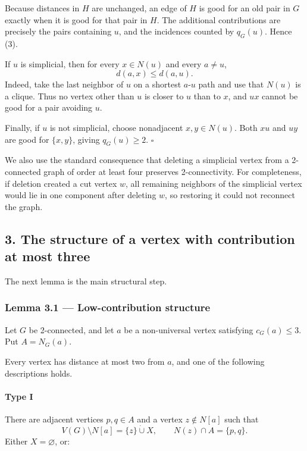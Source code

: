 \documentclass[
  11pt,
  a4paper,
]{article}
\begin{document}
Because distances in \(H\) are unchanged, an edge of \(H\) is good for
an old pair in \(G\) exactly when it is good for that pair in \(H\). The
additional contributions are precisely the pairs containing \(u\), and
the incidences counted by \(q_G(u)\). Hence (3).

If \(u\) is simplicial, then for every \(x\in N(u)\) and every
\(a\ne u\), \[
d(a,x)\le d(a,u).
\] Indeed, take the last neighbor of \(u\) on a shortest \(a\)-\(u\)
path and use that \(N(u)\) is a clique. Thus no vertex other than \(u\)
is closer to \(u\) than to \(x\), and \(ux\) cannot be good for a pair
avoiding \(u\).

Finally, if \(u\) is not simplicial, choose nonadjacent \(x,y\in N(u)\).
Both \(xu\) and \(uy\) are good for \(\{x,y\}\), giving \(q_G(u)\ge2\).
\(\square\)

We also use the standard consequence that deleting a simplicial vertex
from a 2-connected graph of order at least four preserves
2-connectivity. For completeness, if deletion created a cut vertex
\(w\), all remaining neighbors of the simplicial vertex would lie in one
component after deleting \(w\), so restoring it could not reconnect the
graph.

\subsection{3. The structure of a vertex with contribution at most
three}\label{the-structure-of-a-vertex-with-contribution-at-most-three}

The next lemma is the main structural step.

\subsubsection{Lemma 3.1 --- Low-contribution
structure}\label{lemma-3.1-low-contribution-structure}

Let \(G\) be 2-connected, and let \(a\) be a non-universal vertex
satisfying \(c_G(a)\le3\). Put \(A=N_G(a)\).

Every vertex has distance at most two from \(a\), and one of the
following descriptions holds.

\paragraph{Type I}\label{type-i}

There are adjacent vertices \(p,q\in A\) and a vertex \(z\notin N[a]\)
such that \[
V(G)\setminus N[a]=\{z\}\mathbin{\dot\cup}X,
\qquad
N(z)\cap A=\{p,q\}.
\] Either \(X=\varnothing\), or:
\end{document}
